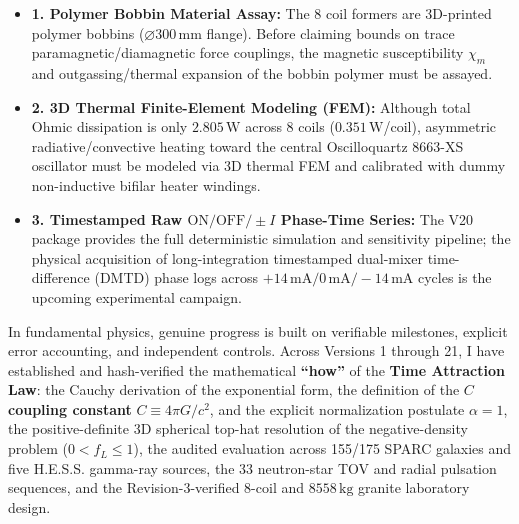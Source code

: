 \documentclass[10pt,a4paper]{article}
\begin{document}
{
\begin{itemize}\setlength{\itemsep}{1pt}\setlength{\parskip}{0pt}\setlength{\topsep}{1pt}
  \item \textbf{1. Polymer Bobbin Material Assay:} The 8 coil formers are 3D-printed polymer bobbins ($\varnothing 300\,\text{mm}$ flange). Before claiming bounds on trace paramagnetic/diamagnetic force couplings, the magnetic susceptibility $\chi_m$ and outgassing/thermal expansion of the bobbin polymer must be assayed.
  \item \textbf{2. 3D Thermal Finite-Element Modeling (FEM):} Although total Ohmic dissipation is only $2.805\,\text{W}$ across 8 coils ($0.351\,\text{W}$/coil), asymmetric radiative/convective heating toward the central Oscilloquartz 8663-XS oscillator must be modeled via 3D thermal FEM and calibrated with dummy non-inductive bifilar heater windings.
  \item \textbf{3. Timestamped Raw $\text{ON}/\text{OFF}/\pm I$ Phase-Time Series:} The V20 package provides the full deterministic simulation and sensitivity pipeline; the physical acquisition of long-integration timestamped dual-mixer time-difference (DMTD) phase logs across $+14\,\text{mA} / 0\,\text{mA} / -14\,\text{mA}$ cycles is the upcoming experimental campaign.
\end{itemize}

\vspace{0.5mm}
\noindent{\color{navy}\rule{\linewidth}{0.6pt}}\par\vspace{0.8mm}
\par\vspace{0.5pt}
In fundamental physics, genuine progress is built on verifiable milestones, explicit error accounting, and independent controls. Across Versions 1 through 21, I have established and hash-verified the mathematical \textbf{``how''} of the \textbf{Time Attraction Law}: the Cauchy derivation of the exponential form, the definition of the \textbf{$C$ coupling constant} $C \equiv 4\pi G/c^2$, and the explicit normalization postulate $\alpha = 1$, the positive-definite 3D spherical top-hat resolution of the negative-density problem ($0 < f_L \le 1$), the audited evaluation across 155/175 SPARC galaxies and five H.E.S.S. gamma-ray sources, the 33 neutron-star TOV and radial pulsation sequences, and the Revision-3-verified 8-coil and $8558\,\text{kg}$ granite laboratory design.

}
\end{document}

